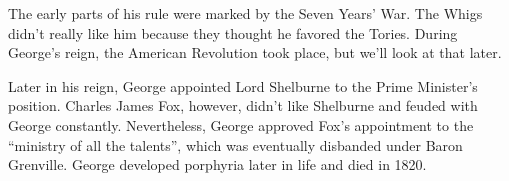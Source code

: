 The early parts of his rule were marked by the Seven Years' War.
The Whigs didn't really like him because they thought he favored the Tories.
During George's reign, the American Revolution took place, but we'll look at that later.

Later in his reign, George appointed Lord Shelburne to the Prime Minister's position.
Charles James Fox, however, didn't like Shelburne and feuded with George constantly.
Nevertheless, George approved Fox's appointment to the ``ministry of all the talents'',
which was eventually disbanded under Baron Grenville.
George developed porphyria later in life and died in 1820.
